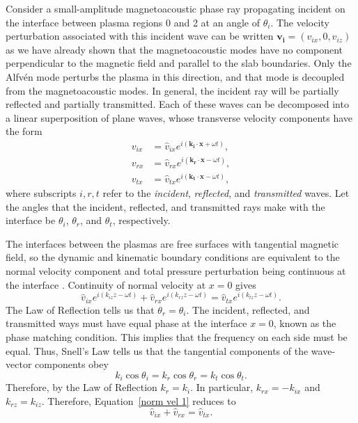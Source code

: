 	Consider a small-amplitude magnetoacoustic phase ray propagating incident on the interface between plasma regions 0 and 2 at an angle of $\theta_i$. The velocity perturbation associated with this incident wave can be written $\mathbf{v_i} = (v_{ix}, 0, v_{iz})$ as we have already shown that the magnetoacoustic modes have no component perpendicular to the magnetic field and parallel to the slab boundaries. Only the Alfv\'{e}n mode perturbs the plasma in this direction, and that mode is decoupled from the magnetoacoustic modes. In general, the incident ray will be partially reflected and partially transmitted. Each of these waves can be decomposed into a linear superposition of plane waves, whose transverse velocity components have the form
	\begin{align}
	v_{ix} &= \widehat{v}_{ix} e^{i(\mathbf{k_i}\cdot \mathbf{x} + \omega t)}, \\
	v_{rx} &= \widehat{v}_{rx} e^{i(\mathbf{k_r}\cdot \mathbf{x} - \omega t)}, \\
	v_{tx} &= \widehat{v}_{tx} e^{i(\mathbf{k_t}\cdot \mathbf{x} - \omega t)},
	\label{fourier}
	\end{align}
	where subscripts $i, r, t$ refer to the \textit{incident}, \textit{reflected}, and \textit{transmitted} waves. Let the angles that the incident, reflected, and transmitted rays make with the interface be $\theta_i$, $\theta_r$, and $\theta_t$, respectively.
	
	The interfaces between the plasmas are free surfaces with tangential magnetic field, so the dynamic and kinematic boundary conditions are equivalent to the normal velocity component and total pressure perturbation being continuous at the interface \citep{goe_etal04}. Continuity of normal velocity at $x = 0$ gives
	\begin{equation}
	\widehat{v}_{ix}e^{i(k_{iz}z - \omega t)} + \widehat{v}_{rx}e^{i(k_{rz}z - \omega t)} = \widehat{v}_{tx}e^{i(k_{tz}z - \omega t)}. \label{norm vel 1}
	\end{equation}
	The Law of Reflection tells us that $\theta_r = \theta_i$. The incident, reflected, and transmitted ways must have equal phase at the interface $x = 0$, known as the phase matching condition. This implies that the frequency on each side must be equal. Thus, Snell's Law tells us that the tangential components of the wave-vector components obey
	\begin{equation}
	k_i\cos{\theta_i} = k_r\cos{\theta_r} = k_t\cos{\theta_t}. \label{tang comp}
	\end{equation}
	Therefore, by the Law of Reflection $k_r = k_i$. In particular, $k_{rx} = -k_{ix}$ and $k_{rz} = k_{iz}$. Therefore, Equation~\eqref{norm vel 1} reduces to
	\begin{equation}
	\widehat{v}_{ix} + \widehat{v}_{rx} = \widehat{v}_{tx}. \label{cont vel}
	\end{equation}
	
